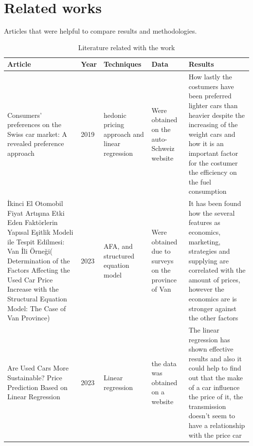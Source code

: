 \documentclass{article}
\begin{document}
\section{Related works}
Articles that were helpful to compare results and methodologies.
\begin{table}[H]
\begin{center}
  \begin{tabular}{|m{2.5cm}|m{2.5cm}|m{2.5cm}|m{2.5cm}|m{2.9cm}|}
    \hline
    Article & Year & Techniques & Data & Results \\ \hline
    Consumers' preferences on the Swiss car market: A revealed preference approach& 2019&hedonic pricing approach and linear regression& Were obtained on the auto-Schweiz website&How lastly the costumers have been preferred lighter cars than heavier despite the increasing of the weight cars and how it is an important factor for the costumer the efficiency on the fuel consumption\\
    \hline
    İkinci El Otomobil Fiyat Artışına Etki Eden Faktörlerin Yapısal Eşitlik Modeli ile Tespit Edilmesi: Van İli Örneği( Determination of the Factors Affecting the Used Car Price Increase with the Structural Equation Model: The Case of Van Province) & 2023 & AFA, and structured equation model& Were obtained due to surveys on the province of Van & It has been found how the several features as economics, marketing, strategies and supplying are correlated with the amount of prices, however the economics are is stronger against the other factors\\
    \hline
    Are Used Cars More Sustainable? Price Prediction Based on Linear Regression&2023&Linear regression&the data was obtained on a website &The linear regression has shown effective results and also it could help to find out that the make of a car influence the price of it, the transmission doesn't seem to have a relationship with the price car\\
    \hline
  \end{tabular}
  \caption{Literature related with the work}
\end{center}
\end{table}
\end{document}
